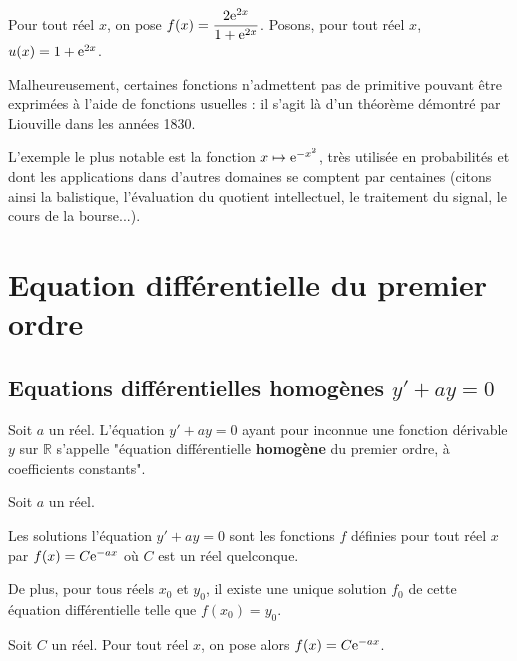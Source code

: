 \documentclass[11pt,fleqn, openany]{book} %
\begin{document}
\begin{example}Pour tout réel $x$, on pose $f(x)=\dfrac{2\mathrm{e}^{2x}}{1+\mathrm{e}^{2x}}$. Posons, pour tout réel $x$, $u(x)=1+\mathrm{e}^{2x}$. 

\vskip50pt
\end{example}

Malheureusement, certaines fonctions n'admettent pas de primitive pouvant être exprimées à l'aide de fonctions usuelles : il s'agit là d'un théorème démontré par Liouville dans les années 1830.

L'exemple le plus notable est la fonction $x\mapsto \mathrm{e}^{-x^2}$, très utilisée en probabilités et dont les applications dans d'autres domaines se comptent par centaines (citons ainsi la balistique, l'évaluation du quotient intellectuel, le traitement du signal,  le cours de la bourse...).

\section{Equation différentielle  du premier ordre}

\subsection{Equations différentielles homogènes $y'+ay=0$}

\begin{definition}Soit $a$ un réel. L'équation $y'+ay=0$ ayant pour inconnue une fonction dérivable $y$ sur $\mathbb{R}$ s'appelle "équation différentielle \textbf{homogène} du premier ordre, à coefficients constants".\end{definition}

\begin{proposition}Soit $a$ un réel.

Les solutions l'équation $y'+ay=0$ sont les fonctions $f$ définies pour tout réel $x$ par $f(x)=C\mathrm{e}^{-ax}$ où $C$ est un réel quelconque.

De plus, pour tous réels $x_0$ et $y_0$, il existe une unique solution $f_0$ de cette équation différentielle telle que $f(x_0)=y_0$.\end{proposition}

\begin{demonstration} Soit $C$ un réel. Pour tout réel $x$, on pose alors $f(x)=C\mathrm{e}^{-ax}$.

\vskip100pt

\end{demonstration}
\end{document}
